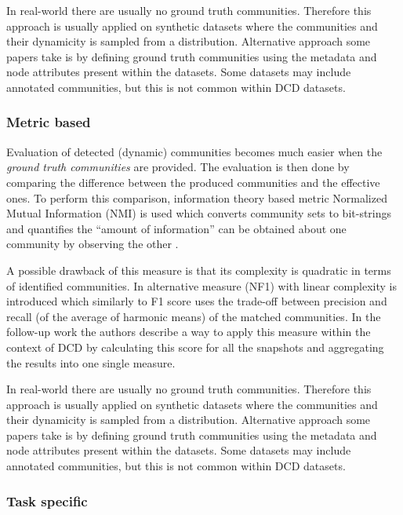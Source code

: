 \documentclass[
acmsmall,
nonacm,
screen,
acmthm]{../../scripts/pandoc/templates/acmart}
\begin{document}
In real-world there are usually no ground truth communities. Therefore
this approach is usually applied on synthetic datasets where the
communities and their dynamicity is sampled from a distribution.
Alternative approach some papers take is by defining ground truth
communities using the metadata and node attributes present within the
datasets. Some datasets may include annotated communities, but this is
not common within DCD datasets.

\hypertarget{metric-based}{%
\subsubsection{Metric based}\label{metric-based}}

Evaluation of detected (dynamic) communities becomes much easier when
the \emph{ground truth communities} are provided. The evaluation is then
done by comparing the difference between the produced communities and
the effective ones. To perform this comparison, information theory based
metric Normalized Mutual Information (NMI) is used which converts
community sets to bit-strings and quantifies the ``amount of
information'' can be obtained about one community by observing the other
\citep{lancichinettiDetectingOverlappingHierarchical2009}.

A possible drawback of this measure is that its complexity is quadratic
in terms of identified communities. In
\citep{rossettiNovelApproachEvaluate2016} alternative measure (NF1) with
linear complexity is introduced which similarly to F1 score uses the
trade-off between precision and recall (of the average of harmonic
means) of the matched communities. In the follow-up work
\citep{rossettiANGELEfficientEffective2020} the authors describe a way
to apply this measure within the context of DCD by calculating this
score for all the snapshots and aggregating the results into one single
measure.

In real-world there are usually no ground truth communities. Therefore
this approach is usually applied on synthetic datasets where the
communities and their dynamicity is sampled from a distribution.
Alternative approach some papers take is by defining ground truth
communities using the metadata and node attributes present within the
datasets. Some datasets may include annotated communities, but this is
not common within DCD datasets.

\hypertarget{task-specific}{%
\subsubsection{Task specific}\label{task-specific}}
\end{document}
